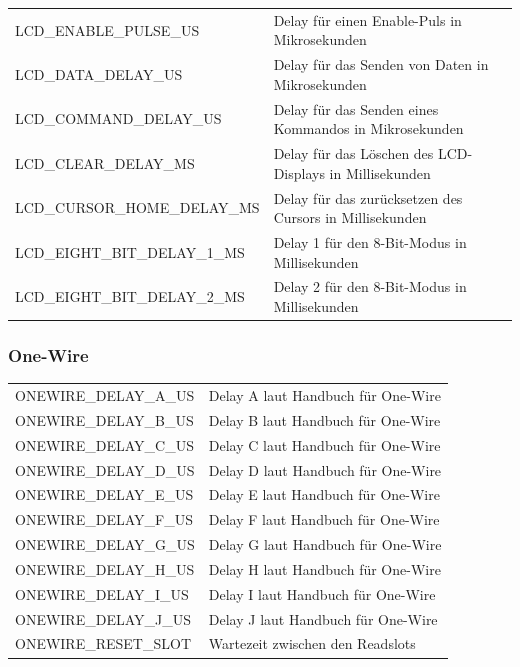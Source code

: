 \documentclass[10pt]{scrartcl}
\begin{document}
\begin{flushleft}
\begin{tabularx}{\textwidth}{XX}
LCD\_ENABLE\_PULSE\_US & Delay für einen Enable-Puls in Mikrosekunden\\
LCD\_DATA\_DELAY\_US & Delay für das Senden von Daten in Mikrosekunden\\
LCD\_COMMAND\_DELAY\_US & Delay für das Senden eines Kommandos in Mikrosekunden\\
LCD\_CLEAR\_DELAY\_MS & Delay für das Löschen des LCD-Displays in Millisekunden\\
LCD\_CURSOR\_HOME\_DELAY\_MS & Delay für das zurücksetzen des Cursors in Millisekunden\\
LCD\_EIGHT\_BIT\_DELAY\_1\_MS & Delay 1 für den 8-Bit-Modus in Millisekunden\\
LCD\_EIGHT\_BIT\_DELAY\_2\_MS & Delay 2 für den 8-Bit-Modus in Millisekunden\\
\end{tabularx}
\end{flushleft}
\subsubsection{One-Wire}
\begin{flushleft}
\begin{tabularx}{\textwidth}{XX}
ONEWIRE\_DELAY\_A\_US & Delay A laut Handbuch für One-Wire\\
ONEWIRE\_DELAY\_B\_US & Delay B laut Handbuch für One-Wire\\
ONEWIRE\_DELAY\_C\_US & Delay C laut Handbuch für One-Wire\\
ONEWIRE\_DELAY\_D\_US & Delay D laut Handbuch für One-Wire\\
ONEWIRE\_DELAY\_E\_US & Delay E laut Handbuch für One-Wire\\
ONEWIRE\_DELAY\_F\_US & Delay F laut Handbuch für One-Wire\\
ONEWIRE\_DELAY\_G\_US & Delay G laut Handbuch für One-Wire\\
ONEWIRE\_DELAY\_H\_US & Delay H laut Handbuch für One-Wire\\
ONEWIRE\_DELAY\_I\_US & Delay I laut Handbuch für One-Wire\\
ONEWIRE\_DELAY\_J\_US & Delay J laut Handbuch für One-Wire\\
ONEWIRE\_RESET\_SLOT & Wartezeit zwischen den Readslots\\
\end{tabularx}
\end{flushleft}
\end{document}
